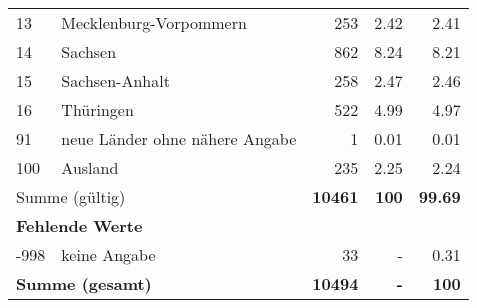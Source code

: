\begin{longtable}{lXrrr}
     13 &
     \multicolumn{1}{X}{ Mecklenburg-Vorpommern   } &


       \num{253} &
       \num[round-mode=places,round-precision=2]{2,42} &
         \num[round-mode=places,round-precision=2]{2,41} \\

     14 &
     \multicolumn{1}{X}{ Sachsen   } &


       \num{862} &
       \num[round-mode=places,round-precision=2]{8,24} &
         \num[round-mode=places,round-precision=2]{8,21} \\

     15 &
     \multicolumn{1}{X}{ Sachsen-Anhalt   } &


       \num{258} &
       \num[round-mode=places,round-precision=2]{2,47} &
         \num[round-mode=places,round-precision=2]{2,46} \\

     16 &
     \multicolumn{1}{X}{ Thüringen   } &


       \num{522} &
       \num[round-mode=places,round-precision=2]{4,99} &
         \num[round-mode=places,round-precision=2]{4,97} \\

     91 &
     \multicolumn{1}{X}{ neue Länder ohne nähere Angabe   } &


       \num{1} &
       \num[round-mode=places,round-precision=2]{0,01} &
         \num[round-mode=places,round-precision=2]{0,01} \\

     100 &
     \multicolumn{1}{X}{ Ausland   } &


       \num{235} &
       \num[round-mode=places,round-precision=2]{2,25} &
         \num[round-mode=places,round-precision=2]{2,24} \\
     \midrule
     \multicolumn{2}{l}{Summe (gültig)} &
       \textbf{\num{10461}} &
     \textbf{100} &
       \textbf{\num[round-mode=places,round-precision=2]{99,69}} \\
     \multicolumn{5}{l}{\textbf{Fehlende Werte}}\\
       -998 &
       keine Angabe &
         \num{33} &
        - &
         \num[round-mode=places,round-precision=2]{0,31} \\
     \midrule
     \multicolumn{2}{l}{\textbf{Summe (gesamt)}} &
          \textbf{\num{10494}} &
        \textbf{-} &
        \textbf{100} \\
     \bottomrule
     \end{longtable}
     
